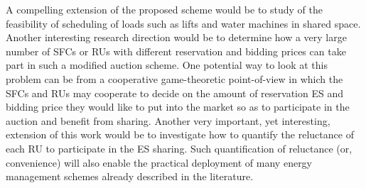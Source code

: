 \documentclass[journal,10pt]{IEEEtran}
\begin{document}
A compelling extension of the proposed scheme would be to study of the feasibility of scheduling of loads such as lifts and water machines in shared space. Another  interesting research direction would be to determine how a very large number of SFCs or RUs with different reservation and bidding prices can take part in such a modified auction scheme. One potential way to look at this problem can be from a cooperative game-theoretic point-of-view in which the SFCs and RUs may cooperate to decide on the amount of reservation ES and bidding price they would like to put into the market so as to participate in the auction and benefit from sharing. Another very important, yet interesting, extension of this work would be to investigate how to quantify the reluctance of each RU to participate in the ES sharing. Such quantification of reluctance (or, convenience) will also enable the practical deployment of many energy management schemes already described in the literature.
\end{document}
